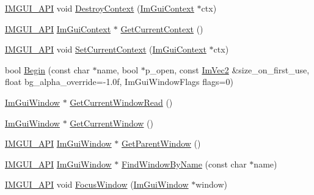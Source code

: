 \begin{DoxyCompactItemize}
\item 
\mbox{\hyperlink{imgui_8h_a43829975e84e45d1149597467a14bbf5}{I\+M\+G\+U\+I\+\_\+\+A\+PI}} void \mbox{\hyperlink{namespace_im_gui_a344adba8bd84069dc7425b88306411c7}{Destroy\+Context}} (\mbox{\hyperlink{struct_im_gui_context}{Im\+Gui\+Context}} $\ast$ctx)
\item 
\mbox{\hyperlink{imgui_8h_a43829975e84e45d1149597467a14bbf5}{I\+M\+G\+U\+I\+\_\+\+A\+PI}} \mbox{\hyperlink{struct_im_gui_context}{Im\+Gui\+Context}} $\ast$ \mbox{\hyperlink{namespace_im_gui_af557a6de5538099a0f6047eb994bbf42}{Get\+Current\+Context}} ()
\item 
\mbox{\hyperlink{imgui_8h_a43829975e84e45d1149597467a14bbf5}{I\+M\+G\+U\+I\+\_\+\+A\+PI}} void \mbox{\hyperlink{namespace_im_gui_a289dbbbffdadcf1231821d97a7c4a9be}{Set\+Current\+Context}} (\mbox{\hyperlink{struct_im_gui_context}{Im\+Gui\+Context}} $\ast$ctx)
\item 
bool \mbox{\hyperlink{namespace_im_gui_a288e01ff1c8102d6374a6b1e409b9878}{Begin}} (const char $\ast$name, bool $\ast$p\+\_\+open, const \mbox{\hyperlink{struct_im_vec2}{Im\+Vec2}} \&size\+\_\+on\+\_\+first\+\_\+use, float bg\+\_\+alpha\+\_\+override=-\/1.\+0f, Im\+Gui\+Window\+Flags flags=0)
\item 
\mbox{\hyperlink{struct_im_gui_window}{Im\+Gui\+Window}} $\ast$ \mbox{\hyperlink{namespace_im_gui_a408f9ddac92f8629a7e273ced5f8c3aa}{Get\+Current\+Window\+Read}} ()
\item 
\mbox{\hyperlink{struct_im_gui_window}{Im\+Gui\+Window}} $\ast$ \mbox{\hyperlink{namespace_im_gui_a7ceba68eca2b09fb6bf1ad88037e6203}{Get\+Current\+Window}} ()
\item 
\mbox{\hyperlink{imgui_8h_a43829975e84e45d1149597467a14bbf5}{I\+M\+G\+U\+I\+\_\+\+A\+PI}} \mbox{\hyperlink{struct_im_gui_window}{Im\+Gui\+Window}} $\ast$ \mbox{\hyperlink{namespace_im_gui_afd2f3d9a23ef5cb331d060a0d77e2cde}{Get\+Parent\+Window}} ()
\item 
\mbox{\hyperlink{imgui_8h_a43829975e84e45d1149597467a14bbf5}{I\+M\+G\+U\+I\+\_\+\+A\+PI}} \mbox{\hyperlink{struct_im_gui_window}{Im\+Gui\+Window}} $\ast$ \mbox{\hyperlink{namespace_im_gui_abca25f22c02e73d5eb2e9c72c4557813}{Find\+Window\+By\+Name}} (const char $\ast$name)
\item 
\mbox{\hyperlink{imgui_8h_a43829975e84e45d1149597467a14bbf5}{I\+M\+G\+U\+I\+\_\+\+A\+PI}} void \mbox{\hyperlink{namespace_im_gui_ade4c08e7e7ad7bbfa4835248f5f3a7c6}{Focus\+Window}} (\mbox{\hyperlink{struct_im_gui_window}{Im\+Gui\+Window}} $\ast$window)
\item 

\end{DoxyCompactItemize}
